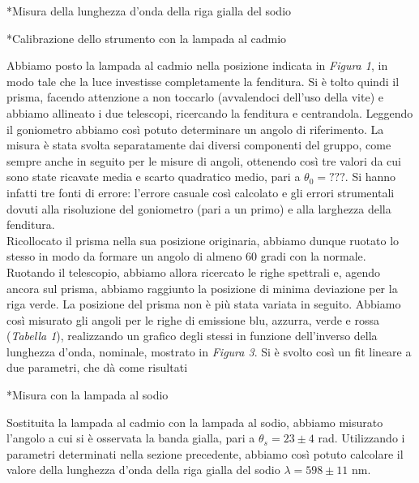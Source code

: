 \begin{section}*{Misura della lunghezza d'onda della riga gialla del sodio}

\begin{subsection}*{Calibrazione dello strumento con la lampada al cadmio}

Abbiamo posto la lampada al cadmio nella posizione indicata in \emph{Figura 1}, in modo tale che la luce investisse completamente la fenditura. Si è tolto quindi il prisma, facendo attenzione a non toccarlo (avvalendoci dell'uso della vite) e abbiamo allineato i due telescopi, ricercando la fenditura e centrandola. Leggendo il goniometro abbiamo così potuto determinare un angolo di riferimento. La misura è stata svolta separatamente dai diversi componenti del gruppo, come sempre anche in seguito per le misure di angoli, ottenendo così tre valori da cui sono state ricavate media e scarto quadratico medio, pari a $\theta_{0} = ??? $. Si hanno infatti tre fonti di errore: l'errore casuale così calcolato e gli errori strumentali dovuti alla risoluzione del goniometro (pari a un primo) e alla larghezza della fenditura.\\ %
Ricollocato il prisma nella sua posizione originaria, abbiamo dunque ruotato lo stesso in modo da formare un angolo di almeno 60 gradi con la normale. Ruotando il telescopio, abbiamo allora ricercato le righe spettrali e, agendo ancora sul prisma, abbiamo raggiunto la posizione di minima deviazione per la riga verde. La posizione del prisma non è più stata variata in seguito. Abbiamo così misurato gli angoli per le righe di emissione blu, azzurra, verde e rossa (\emph{Tabella 1}), realizzando un grafico degli stessi in funzione dell'inverso della lunghezza d'onda, nominale, mostrato in \emph{Figura 3}. Si è svolto così un fit lineare a due parametri, che dà come risultati  \\ %

\end{subsection}

\begin{subsection}*{Misura con la lampada al sodio}

Sostituita la lampada al cadmio con la lampada al sodio, abbiamo misurato l'angolo a cui si è osservata la banda gialla, pari a $\theta_{s} = 23 \pm 4$ rad. Utilizzando i parametri determinati nella sezione precedente, abbiamo così potuto calcolare il valore della lunghezza d'onda della riga gialla del sodio $\lambda = 598 \pm 11$ nm.

\end{subsection}

\end{section}


